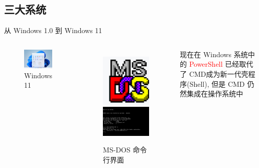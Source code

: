 \subsection{三大系统}

\begin{frame}{从 Windows 1.0 到 Windows 11}
    \begin{columns}
        \begin{figure}
            \centering
            \includegraphics[width=5cm]{Images/windows5.png}
            \caption{Windows 11}
        \end{figure}

        \begin{figure}
            \centering
            \includegraphics[width=0.1\linewidth]{Images/windows3.jpg}
            \includegraphics[width=5.2cm]{Images/windows4.png}
            \caption{MS-DOS 命令行界面}
        \end{figure}
        \tiny{现在在 Windows 系统中的 \textcolor{red}{PowerShell} 已经取代了 CMD成为新一代壳程序(Shell), 但是 CMD 仍然集成在操作系统中}
    \end{columns}
\end{frame}


